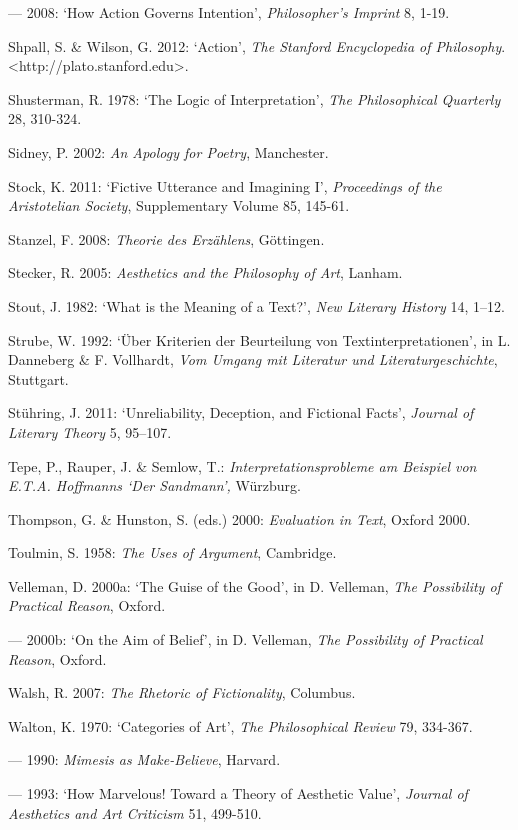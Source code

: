 \begin{hangparas}{.5cm}{1}
--- 2008: `How Action Governs Intention', \emph{Philosopher's Imprint} 8, 1-19.

Shpall, S. \& Wilson, G. 2012: `Action', \emph{The Stanford Encyclopedia of Philosophy}. \textless{}http://plato.stanford.edu\textgreater{}.

Shusterman, R. 1978: `The Logic of Interpretation', \emph{The Philosophical Quarterly} 28, 310-324.

Sidney, P. 2002: \emph{An Apology for Poetry}, Manchester.

Stock, K. 2011: `Fictive Utterance and Imagining I', \emph{Proceedings of the Aristotelian Society}, Supplementary Volume 85, 145-61.

Stanzel, F. 2008: \emph{Theorie des Erz\"ahlens}, G\"ottingen. 

Stecker, R. 2005: \emph{Aesthetics and the Philosophy of Art}, Lanham.

Stout, J. 1982: `What is the Meaning of a Text?', \emph{New Literary History} 14, 1--12.

Strube, W. 1992: `\"Uber Kriterien der Beurteilung von Textinterpretationen', in L. Danneberg \& F. Vollhardt, \emph{Vom Umgang mit Literatur und Literaturgeschichte}, Stuttgart.

St\"uhring, J. 2011: `Unreliability, Deception, and Fictional Facts', \emph{Journal of Literary Theory} 5, 95--107.

Tepe, P., Rauper, J. \& Semlow, T.: \emph{Interpretationsprobleme am Beispiel von E.T.A. Hoffmanns `Der Sandmann',} W\"urzburg.

Thompson, G. \& Hunston, S. (eds.) 2000: \emph{Evaluation in Text}, Oxford 2000.

Toulmin, S. 1958: \emph{The Uses of Argument}, Cambridge.

Velleman, D. 2000a: `The Guise of the Good', in D. Velleman, \emph{The Possibility of Practical Reason}, Oxford.

--- 2000b: `On the Aim of Belief', in D. Velleman, \emph{The Possibility of Practical Reason}, Oxford.

Walsh, R. 2007: \emph{The Rhetoric of Fictionality}, Columbus.

Walton, K. 1970: `Categories of Art', \emph{The Philosophical Review} 79, 334-367.

--- 1990: \emph{Mimesis as Make-Believe}, Harvard.

--- 1993: `How Marvelous! Toward a Theory of Aesthetic Value', \emph{Journal of Aesthetics and Art Criticism} 51, 499-510.


\end{hangparas}
